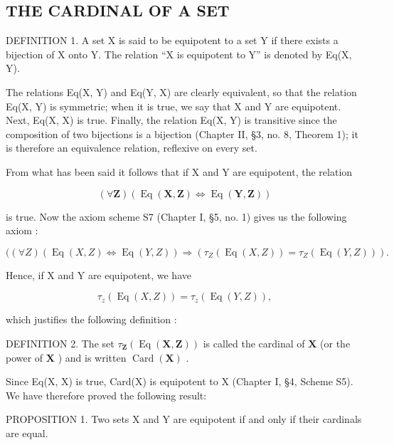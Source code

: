 \subsection{THE CARDINAL OF A SET}

DEFINITION 1. A set X is said to be equipotent to a set Y if there exists a bijection of X onto Y. The relation ``X is equipotent to Y'' is denoted by Eq(X, Y).

The relations Eq(X, Y) and Eq(Y, X) are clearly equivalent, so that the relation Eq(X, Y) is symmetric; when it is true, we say that X and Y are equipotent. Next, Eq(X, X) is true. Finally, the relation Eq(X, Y) is transitive since the composition of two bijections is a bijection (Chapter II, §3, no. 8, Theorem 1); it is therefore an equivalence relation, reflexive on every set.

From what has been said it follows that if X and Y are equipotent, the relation

\[
(\forall \mathbf {Z}) (\operatorname{Eq} (\mathbf {X}, \mathbf {Z}) \Longleftrightarrow \operatorname{Eq} (\mathbf {Y}, \mathbf {Z}))
\]

is true. Now the axiom scheme S7 (Chapter I, §5, no. 1) gives us the following axiom :

\[
((\forall Z) (\operatorname{Eq} (X, Z) \Longleftrightarrow \operatorname{Eq} (Y, Z)) \Longrightarrow (\tau_ {Z} (\operatorname{Eq} (X, Z)) = \tau_ {Z} (\operatorname{Eq} (Y, Z))).
\]

Hence, if X and Y are equipotent, we have

\[
\tau_ {z} (\operatorname{Eq} (X, Z)) = \tau_ {z} (\operatorname{Eq} (Y, Z)),
\]

which justifies the following definition :

DEFINITION 2. The set \(\tau_{\mathbf{Z}}(\operatorname{Eq}(\mathbf{X},\mathbf{Z}))\) is called the cardinal of \(\mathbf{X}\) (or the power of \(\mathbf{X}\) ) and is written \(\operatorname{Card}(\mathbf{X})\) .

Since Eq(X, X) is true, Card(X) is equipotent to X (Chapter I, §4, Scheme S5). We have therefore proved the following result:

PROPOSITION 1. Two sets X and Y are equipotent if and only if their cardinals are equal.



